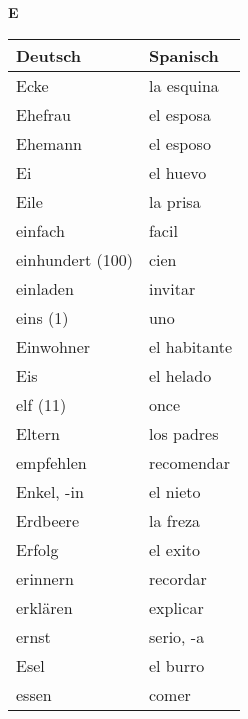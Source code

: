 \begin{flushright}\begin{Huge}\textbf{E}\end{Huge}\end{flushright}

\begin{longtable}{p{} p{}} 
\textbf{Deutsch}     & \textbf{Spanisch}                                       \\ \hline
\hline
\endhead %
Ecke & la esquina \\
Ehefrau &  el esposa\\
Ehemann & el esposo\\
Ei & el huevo\\
Eile & la prisa\\
einfach & facil\\
einhundert (100) & cien\\
einladen & invitar\\
eins (1) & uno\\
Einwohner & el habitante\\
Eis & el helado\\
elf (11) & once\\
Eltern & los padres\\
empfehlen & recomendar\\
Enkel, -in & el nieto\\
Erdbeere & la freza\\
Erfolg & el exito\\
erinnern & recordar\\
erklären & explicar\\
ernst & serio, -a\\
Esel & el burro\\
essen & comer \\

\end{longtable}

